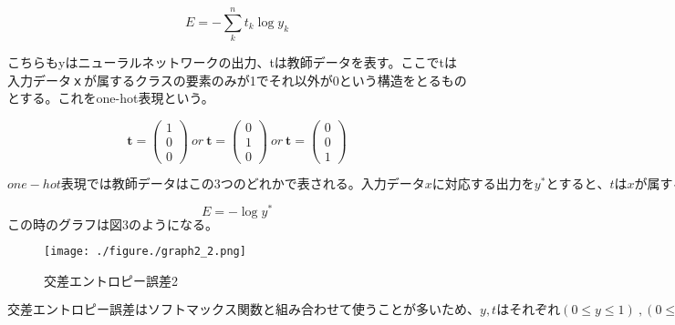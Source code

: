 \begin{equation}
\label{交差エントロピー誤差}
E = -\sum_k^n t_k \log y_k
\end{equation}

こちらもyはニューラルネットワークの出力、tは教師データを表す。ここでtは入力データｘが属するクラスの要素のみが1でそれ以外が0という構造をとるものとする。これをone-hot表現という。

\[
  \bm{t} = \left(
    \begin{array}{c}
      1 \\
      0 \\
      0
    \end{array}
	\right)\ or\ 
\bm{t} = \left(
    \begin{array}{c}
      0 \\
      1 \\
      0
    \end{array}
  \right)\ or\ 
\bm{t} = \left(
    \begin{array}{c}
      0 \\
      0 \\
      1
    \end{array}
  \right)
\]

$one-hot表現では教師データはこの3つのどれかで表される。入力データxに対応する出力をy^*とすると、tはxが属するクラスのみ1でそれ以外が0となるため、交差エントロピー誤差の式は次のように変形できる。$

\begin{equation}
\label{交差エントロピー誤差}
E = - \log y^*
\end{equation}
$この時のグラフは図3のようになる。$

\begin{figure}[h]
\begin{center}
\texttt{[image: ./figure./graph2\_2.png]}
\end{center}
\caption{交差エントロピー誤差2}
\end{figure}

$交差エントロピー誤差はソフトマックス関数と組み合わせて使うことが多いため、y,tはそれぞれ(0\le y \le 1)\ , (0\le t \le 1)となり、確率のように扱える。交差エントロピー誤差はyがtに近い値を出力するほど値が小さくなっていく。交差エントロピー誤差の最小値はy=1、つまりy=tになる時に最小値をとる。またy=0の時は損失関数の値が∞に発散してしまうので、実装する際にはyに微小な値を足し合わせることで発散を防ぐ。$
\begin{flushright}
\bunseki{※伊藤晋之介}
\end{flushright}

